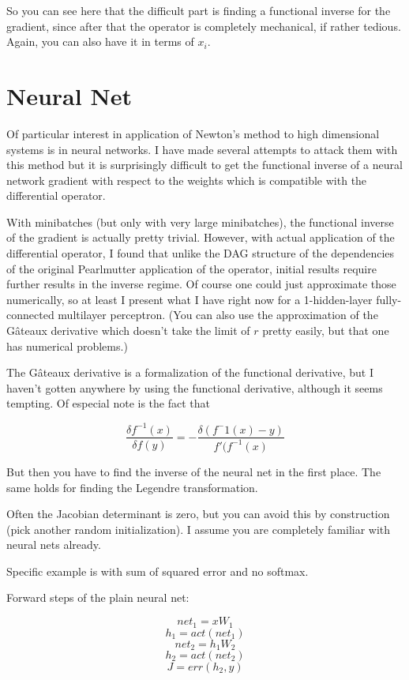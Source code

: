 \documentclass{article}
\begin{document}
So you can see here that the difficult part is finding a functional inverse for the gradient, since after that the operator is completely mechanical, if rather tedious. Again, you can also have it in terms of $x_i$.

\section{Neural Net}

Of particular interest in application of Newton's method to high dimensional systems is in neural networks. I have made several attempts to attack them with this method but it is surprisingly difficult to get the functional inverse of a neural network gradient with respect to the weights which is compatible with the differential operator.

With minibatches (but only with very large minibatches), the functional inverse of the gradient is actually pretty trivial. However, with actual application of the differential operator, I found that unlike the DAG structure of the dependencies of the original Pearlmutter application of the operator, initial results require further results in the inverse regime. Of course one could just approximate those numerically, so at least I present what I have right now for a 1-hidden-layer fully-connected multilayer perceptron. (You can also use the approximation of the G\^{a}teaux derivative which doesn't take the limit of $r$ pretty easily, but that one has numerical problems.)

The G\^{a}teaux derivative is a formalization of the functional derivative, but I haven't gotten anywhere by using the functional derivative, although it seems tempting. Of especial note is the fact that

$$\frac{\delta f^{-1}(x)}{\delta f(y)} = - \frac{\delta(f^-1(x) - y)}{f'(f^{-1}(x)} $$

But then you have to find the inverse of the neural net in the first place. The same holds for finding the Legendre transformation.

Often the Jacobian determinant is zero, but you can avoid this by construction (pick another random initialization). I assume you are completely familiar with neural nets already\cite{deeplearning}.

Specific example is with sum of squared error and no softmax.

Forward steps of the plain neural net:

$$ net_1 = xW_1 $$
$$ h_1 = act(net_1) $$
$$ net_2 = h_1W_2 $$
$$ h_2 = act(net_2) $$
$$ J = err(h_2, y) $$
\end{document}

